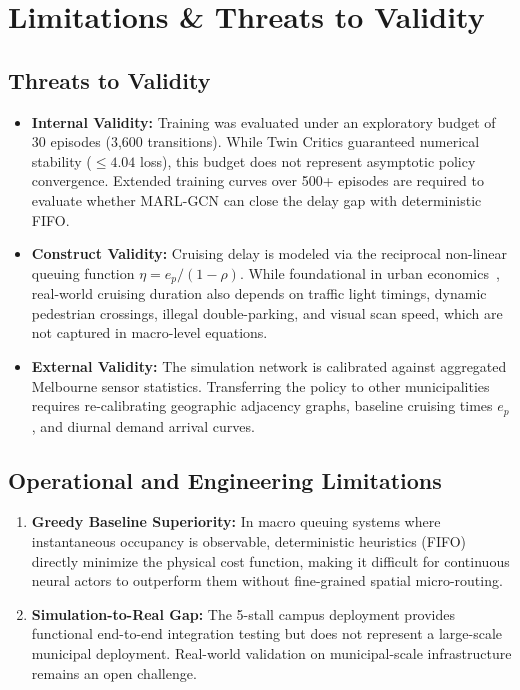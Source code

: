 \documentclass[journal]{IEEEtran}
\begin{document}
\section{Limitations \& Threats to Validity}
\label{sec:limitations}

\subsection{Threats to Validity}
\begin{itemize}
    \item \textbf{Internal Validity:} Training was evaluated under an exploratory budget of 30 episodes (3,600 transitions). While Twin Critics guaranteed numerical stability ($\le 4.04$ loss), this budget does not represent asymptotic policy convergence. Extended training curves over 500+ episodes are required to evaluate whether MARL-GCN can close the delay gap with deterministic FIFO.
    \item \textbf{Construct Validity:} Cruising delay is modeled via the reciprocal non-linear queuing function $\eta = e_p / (1 - \rho)$. While foundational in urban economics~\cite{shoup2005high,arnott2006economic}, real-world cruising duration also depends on traffic light timings, dynamic pedestrian crossings, illegal double-parking, and visual scan speed, which are not captured in macro-level equations.
    \item \textbf{External Validity:} The simulation network is calibrated against aggregated Melbourne sensor statistics. Transferring the policy to other municipalities requires re-calibrating geographic adjacency graphs, baseline cruising times $e_p$, and diurnal demand arrival curves.
\end{itemize}

\subsection{Operational and Engineering Limitations}
\begin{enumerate}
    \item \textbf{Greedy Baseline Superiority:} In macro queuing systems where instantaneous occupancy is observable, deterministic heuristics (FIFO) directly minimize the physical cost function, making it difficult for continuous neural actors to outperform them without fine-grained spatial micro-routing.
    \item \textbf{Simulation-to-Real Gap:} The 5-stall campus deployment provides functional end-to-end integration testing but does not represent a large-scale municipal deployment. Real-world validation on municipal-scale infrastructure remains an open challenge.
\end{enumerate}
\end{document}
